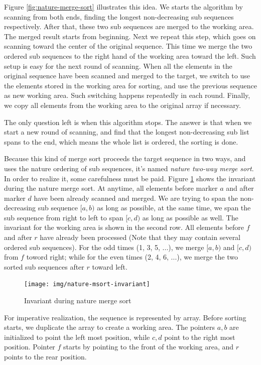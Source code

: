 \documentclass[b5paper]{article}
\begin{document}
Figure \ref{fig:nature-merge-sort} illustrates this idea. We starts the algorithm by scanning
from both ends, finding the longest non-decreasing sub sequences respectively. After that,
these two sub sequences are merged to the working area. The merged result starts from beginning.
Next we repeat this step, which goes on scanning toward the center of the original sequence.
This time we merge the two ordered sub sequences to the right hand of the working area toward
the left. Such setup is easy for the next round of scanning. When all the elements
in the original sequence have been scanned and merged to the target, we switch to use the
elements stored in the working area for sorting, and use the previous sequence as new working area.
Such switching happens repeatedly in each round. Finally, we copy all elements from the
working area to the original array if necessary.

The only question left is when this algorithm stops. The answer is that when we start
a new round of scanning, and find that the longest non-decreasing sub list spans to the
end, which means the whole list is ordered, the sorting is done.

Because this kind of merge sort proceeds the target sequence in two ways, and uses the
nature ordering of sub sequences, it's named {\em nature two-way merge sort}. In order
to realize it, some carefulness must be paid. Figure \ref{fig:nature-msort-invariant}
shows the invariant during the nature merge sort. At anytime, all elements before marker
$a$ and after marker $d$ have been already scanned and merged. We are trying to
span the non-decreasing sub sequence $[a, b)$ as long as possible, at the same time,
we span the sub sequence from right to left to span $[c, d)$ as long as possible as well.
The invariant for the working area is shown in the second row. All elements before
$f$ and after $r$ have already been processed (Note that they may contain several
ordered sub sequences). For the odd times (1, 3, 5, ...), we merge $[a, b)$ and $[c, d)$
from $f$ toword right; while for the even times (2, 4, 6, ...), we merge the two
sorted sub sequences after $r$ toward left.

\begin{figure}[htbp]
 \centering
 \texttt{[image: img/nature-msort-invariant]}
 \caption{Invariant during nature merge sort}
 \label{fig:nature-msort-invariant}
\end{figure}

For imperative realization, the sequence is represented by array. Before sorting starts,
we duplicate the array to create a working area. The pointers $a, b$ are initialized to
point the left most position, while $c, d$ point to the right most position. Pointer $f$
starts by pointing to the front of the working area, and $r$ points to the rear
position.
\end{document}
